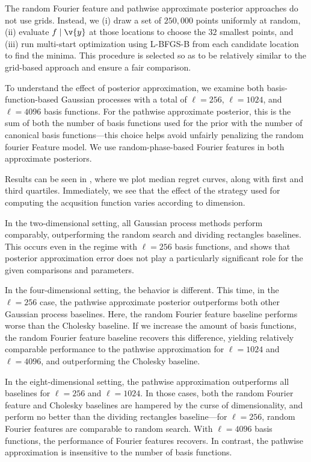 \documentclass[11pt]{book}
\begin{document}
The random Fourier feature and pathwise approximate posterior approaches do not use grids.
Instead, we (i) draw a set of $250,000$ points uniformly at random, (ii) evaluate $f \given \v{y}$ at those locations to choose the $32$ smallest points, and (iii) run multi-start optimization using L-BFGS-B \cite{byrd95} from each candidate location to find the minima.
This procedure is selected so as to be relatively similar to the grid-based approach and ensure a fair comparison.


To understand the effect of posterior approximation, we examine both basis-function-based Gaussian processes with a total of $\ell = 256$, $\ell = 1024$, and $\ell = 4096$ basis functions.
For the pathwise approximate posterior, this is the sum of both the number of basis functions used for the prior with the number of canonical basis functions---this choice helps avoid unfairly penalizing the random fourier Feature model.
We use random-phase-based Fourier features in both approximate posteriors.

Results can be seen in , where we plot median regret curves, along with first and third quartiles.
Immediately, we see that the effect of the strategy used for computing the acqusition function varies according to dimension.

In the two-dimensional setting, all Gaussian process methods perform comparably, outperforming the random search and dividing rectangles baselines.
This occurs even in the regime with $\ell = 256$ basis functions, and shows that posterior approximation error does not play a particularly significant role for the given comparisons and parameters.

In the four-dimensional setting, the behavior is different.
This time, in the $\ell = 256$ case, the pathwise approximate posterior outperforms both other Gaussian process baselines.
Here, the random Fourier feature baseline performs worse than the Cholesky baseline.
If we increase the amount of basis functions, the random Fourier feature baseline recovers this difference, yielding relatively comparable performance to the pathwise approximation for $\ell = 1024$ and $\ell = 4096$, and outperforming the Cholesky baseline.

In the eight-dimensional setting, the pathwise approximation outperforms all baselines for $\ell = 256$ and $\ell = 1024$.
In those cases, both the random Fourier feature and Cholesky baselines are hampered by the curse of dimensionality, and perform no better than the dividing rectangles baseline---for $\ell = 256$, random Fourier features are comparable to random search.
With $\ell = 4096$ basis functions, the performance of Fourier features recovers.
In contrast, the pathwise approximation is insensitive to the number of basis functions.
\end{document}
